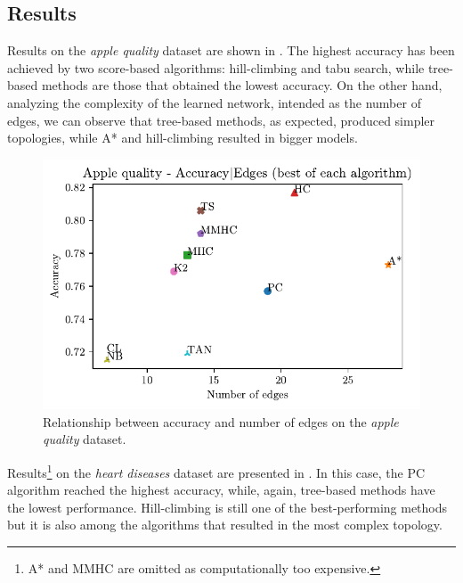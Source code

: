 \documentclass[letterpaper]{article}
\begin{document}

\subsection{Results}

Results on the \textit{apple quality} dataset are shown in .
The highest accuracy has been achieved by two score-based algorithms: hill-climbing and tabu search,
while tree-based methods are those that obtained the lowest accuracy.
On the other hand, analyzing the complexity of the learned network, intended as the number of edges,
we can observe that tree-based methods, as expected, produced simpler topologies, while A* and hill-climbing resulted in bigger models.

\begin{figure}[h]
    \centering
    \includegraphics[width=\linewidth]{img/apple_acc_edges.pdf}
    \caption{Relationship between accuracy and number of edges on the \textit{apple quality} dataset.}
    \label{img:apple}
\end{figure}

Results\footnote{A* and MMHC are omitted as computationally too expensive.} 
on the \textit{heart diseases} dataset are presented in .
In this case, the PC algorithm reached the highest accuracy, while, again, tree-based methods have the lowest performance.
Hill-climbing is still one of the best-performing methods but 
it is also among the algorithms that resulted in the most complex topology.
\end{document}
